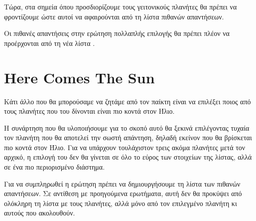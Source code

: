 \documentclass[a4paper,11pt,oneside]{book}
\begin{document}
Τώρα, στα σημεία όπου προσδιορίζουμε τους γειτονικούς πλανήτες θα πρέπει να φροντίζουμε ώστε αυτοί να αφαιρούνται από τη λίστα πιθανών απαντήσεων.




\clearpage
Οι πιθανές απαντήσεις στην ερώτηση πολλαπλής επιλογής θα πρέπει πλέον να προέρχονται από τη νέα λίστα .


\section{Here Comes The Sun}

\begin{question}
Κάτι άλλο που θα μπορούσαμε να ζητάμε από τον παίκτη είναι να επιλέξει ποιος από τους πλανήτες που του δίνονται είναι πιο κοντά στον Ήλιο.
\end{question}

Η συνάρτηση που θα υλοποιήσουμε για το σκοπό αυτό θα ξεκινά επιλέγοντας τυχαία τον πλανήτη που θα αποτελεί την σωστή απάντηση, δηλαδή εκείνον που θα βρίσκεται πιο κοντά στον Ήλιο. Για να υπάρχουν τουλάχιστον τρεις ακόμα πλανήτες μετά τον αρχικό, η επιλογή του δεν θα γίνεται σε όλο το εύρος των στοιχείων της λίστας, αλλά σε ένα πιο περιορισμένο διάστημα.


Για να συμπληρωθεί η ερώτηση πρέπει να δημιουργήσουμε τη λίστα των πιθανών απαντήσεων. Σε αντίθεση με προηγούμενα ερωτήματα, αυτή δεν θα προκύψει από ολόκληρη τη λίστα με τους πλανήτες, αλλά μόνο από τον επιλεγμένο πλανήτη κι αυτούς που ακολουθούν.
\end{document}
